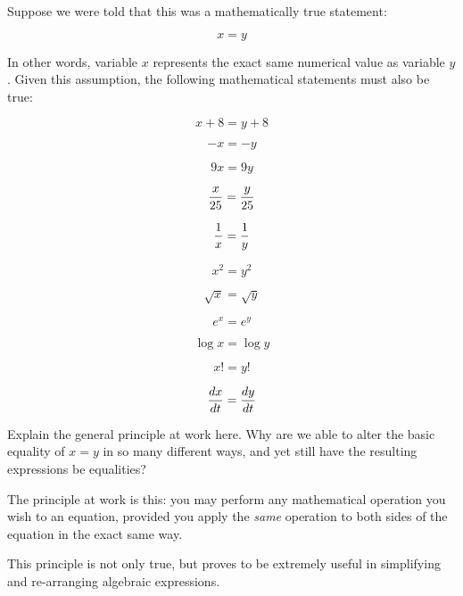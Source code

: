 

Suppose we were told that this was a mathematically true statement:

$$x = y$$

In other words, variable $x$ represents the exact same numerical value as variable $y$.  Given this assumption, the following mathematical statements must also be true:

$$x + 8 = y + 8$$

$$-x = -y$$

$$9x = 9y$$

$${x \over 25} = {y \over 25}$$

$${1 \over x} = {1 \over y}$$

$$x^2 = y^2$$

$$\sqrt{x} = \sqrt{y}$$

$$e^x = e^y$$

$$\log x = \log y$$

$$x! = y!$$

$${dx \over dt} = {dy \over dt}$$

Explain the general principle at work here.  Why are we able to alter the basic equality of $x = y$ in so many different ways, and yet still have the resulting expressions be equalities? 







The principle at work is this: you may perform any mathematical operation you wish to an equation, provided you apply the {\it same} operation to both sides of the equation in the exact same way.







This principle is not only true, but proves to be extremely useful in simplifying and re-arranging algebraic expressions.




